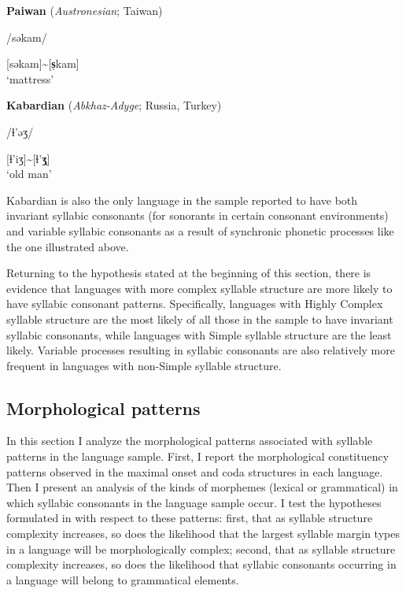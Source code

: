 \ea\label{ex:3.19}
  \textbf{Paiwan} (\textit{Austronesian}; Taiwan)

/səkam/

[səkam]{\textasciitilde}[\textbf{s̩}kam]\\
\glt ‘mattress’
\citep[41]{Chang2006}
\z

\ea\label{ex:3.20}
  \textbf{Kabardian} (\textit{Abkhaz-Adyge}; Russia, Turkey)

/ɬ{}'əʒ/

[ɬ’iʒ]{\textasciitilde}[ɬ{}'\textbf{ʒ̩}]\\
\glt ‘old man’
\citep[24]{Kuipers1960}
\z

Kabardian is also the only language in the sample reported to have both invariant syllabic consonants (for sonorants in certain consonant environments) and variable syllabic consonants as a result of synchronic phonetic processes like the one illustrated above.

  Returning to the hypothesis stated at the beginning of this section, there is evidence that languages with more complex syllable structure are more likely to have syllabic consonant patterns. Specifically, languages with Highly Complex syllable structure are the most likely of all those in the sample to have invariant syllabic consonants, while languages with Simple syllable structure are the least likely. Variable processes resulting in syllabic consonants are also relatively more frequent in languages with non-Simple syllable structure.

\subsection{Morphological patterns}\label{sec:3.3.6}

  In this section I analyze the morphological patterns associated with syllable patterns in the language sample. First, I report the morphological constituency patterns observed in the maximal onset and coda structures in each language. Then I present an analysis of the kinds of morphemes (lexical or grammatical) in which syllabic consonants in the language sample occur. I test the hypotheses formulated in  with respect to these patterns: first, that as syllable structure complexity increases, so does the likelihood that the largest syllable margin types in a language will be morphologically complex; second, that as syllable structure complexity increases, so does the likelihood that syllabic consonants occurring in a language will belong to grammatical elements.

